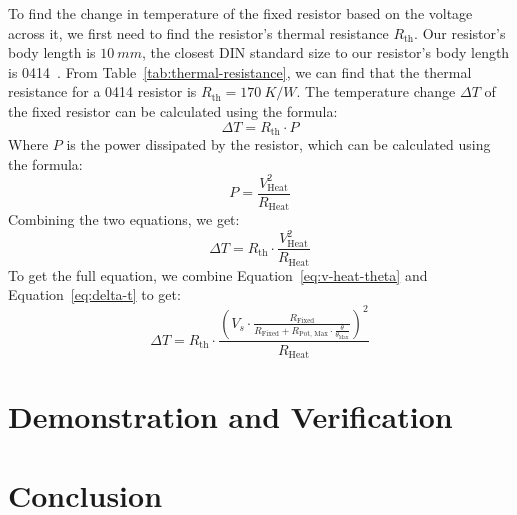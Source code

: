 \documentclass[12pt,a4paper]{article}
\begin{document}
To find the change in temperature of the fixed resistor based on the voltage across it, we first need to find the resistor's thermal resistance $R_{\text{th}}$. Our resistor's body length is $\SI{10}{mm}$, the closest DIN standard size to our resistor's body length is 0414~\cite[pp.~13]{din}. From Table~\ref{tab:thermal-resistance}, we can find that the thermal resistance for a 0414 resistor is $R_{\text{th}} = \SI{170}{K/W}$. The temperature change $\Delta T$ of the fixed resistor can be calculated using the formula:
\begin{equation*}
    \Delta T = R_{\text{th}} \cdot P
\end{equation*}
Where $P$ is the power dissipated by the resistor, which can be calculated using the formula:
\begin{equation*}
    P = \frac{V_{\text{Heat}}^2}{R_{\text{Heat}}}
\end{equation*}
Combining the two equations, we get:
\begin{equation}
    \Delta T = R_{\text{th}} \cdot \frac{V_{\text{Heat}}^2}{R_{\text{Heat}}}
    \label{eq:delta-t}
\end{equation}
To get the full equation, we combine Equation~\ref{eq:v-heat-theta} and Equation~\ref{eq:delta-t} to get:
\begin{equation}
    \Delta T = R_{\text{th}} \cdot \frac{\left(V_s \cdot \frac{R_{\text{Fixed}}}{R_{\text{Fixed}} + R_{\text{Pot, Max}} \cdot \frac{\theta}{\theta_{\text{Max}}}}\right)^2}{R_{\text{Heat}}}
    \label{eq:full-delta-t}
\end{equation}


\label{sec:math-model}


\section{Demonstration and Verification}

\section{Conclusion}


\newpage


\end{document}

